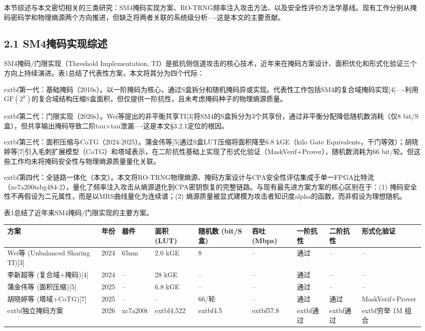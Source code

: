 \documentclass[journal]{IEEEtran}
\begin{document}
本节综述与本文密切相关的三类研究：SM4掩码实现方案、RO-TRNG频率注入攻击方法、以及安全性评价方法学基线。现有工作分别从掩码密码学和物理熵源两个方向推进，但缺乏将两者关联的系统级分析----这是本文的主要贡献。

\subsection{2.1 SM4掩码实现综述}

SM4掩码/门限实现（Threshold Implementation, TI）是抵抗侧信道攻击的核心技术，近年来在掩码方案设计、面积优化和形式化验证三个方向上持续演进。表1总结了代表性方案，本文将其分为四个代际：

	extbf{第一代：基础掩码（2010s）}。以一阶掩码为核心，通过S盒拆分和随机掩码异或实现。代表性工作包括SM4的复合域掩码实现[4]----利用$\mathrm{GF}(2^8)$的复合域结构压缩S盒面积，但仅提供一阶抗性，且未考虑掩码种子的物理熵源质量。

	extbf{第二代：门限实现（2020s）}。Wei等提出的非平衡共享TI[3]将SM4的S盒拆分为3个共享份，通过非平衡分配降低随机数消耗（仅8 bit/S盒），但共享输出掩码导致二阶tau$\times$tau泄漏----这是本文§3.2.1定位的根因。

	extbf{第三代：面积压缩与CoTG（2024-2025）}。蒲金伟等[5]通过S盒LUT压缩将面积降至6.8 kGE（kilo Gate Equivalents，千门等效）；胡晓婷等[7]引入毛刺扩展模型（CoTG）和塔域表示，在二阶抗性基础上实现了形式化验证（MaskVerif+Prover），随机数消耗为66 bit/轮。但这些工作均未将掩码安全性与物理熵源质量量化关联。

	extbf{第四代：全链路一体化（本文）}。本文将RO-TRNG物理熵源、掩码方案设计与CPA安全性评估集成于单一FPGA比特流（xc7a200tsbg484-2），量化了频率注入攻击从熵源退化到CPA密钥恢复的完整链路。与现有最先进方案方案的核心区别在于：(1) 掩码安全性不再假设为二元属性，而是以MRS曲线量化为连续谱；(2) 熵源质量被显式建模为攻击者知识度alpha的函数，而非假设为理想随机。

表1总结了近年来SM4掩码/门限实现的主要方案。

\begin{table}[h]
\centering
\begin{tabular}{lllllllll}
\hline
\textbf{方案} & \textbf{年份} & \textbf{器件} & \textbf{面积 (LUT)} & \textbf{随机数 (bit/S盒)} & \textbf{吞吐 (Mbps)} & \textbf{一阶抗性} & \textbf{二阶抗性} & \textbf{形式化验证} \\
\hline
Wei等 (Unbalanced Sharing TI)[3] & 2024 & 65nm & 2.0 kGE & 8 & -- & 通过 & -- & -- \\
李新超等 (复合域+掩码)[4] & 2024 & -- & 28 kGE & -- & -- & 通过 & -- & -- \\
蒲金伟等 (面积压缩)[5] & 2025 & -- & 6.8 kGE & -- & -- & 通过 & -- & -- \\
胡晓婷等 (塔域+CoTG)[7] & 2025 & -- & -- & 66/轮 & -- & 通过 & 通过 & MaskVerif+Prover \\
	extbf{独立掩码方案} & 2026 & xc7a200t & 	extbf{4,522} & 	extbf{4.5} & 	extbf{57.8} & 	extbf{通过} & 	extbf{通过} & 	extbf{穷举 1M 组合} \\
\hline
\end{tabular}
\end{table}
\end{document}
